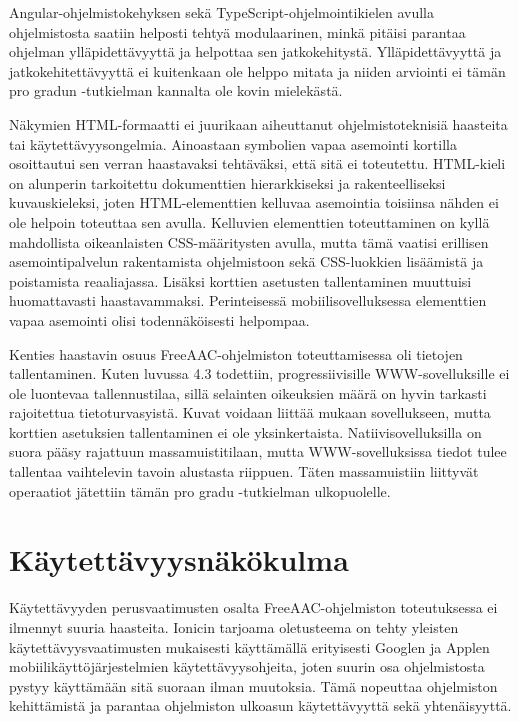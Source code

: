\documentclass[utf8]{gradu3}
\begin{document}
Angular-ohjelmistokehyksen sekä TypeScript-ohjelmointikielen avulla ohjelmistosta saatiin helposti tehtyä modulaarinen, minkä pitäisi parantaa ohjelman ylläpidettävyyttä ja helpottaa sen jatkokehitystä. Ylläpidettävyyttä ja jatkokehitettävyyttä ei kuitenkaan ole helppo mitata ja niiden arviointi ei tämän pro gradun -tutkielman kannalta ole kovin mielekästä.

Näkymien HTML-formaatti ei juurikaan aiheuttanut ohjelmistoteknisiä haasteita tai käytettävyysongelmia. Ainoastaan symbolien vapaa asemointi kortilla osoittautui sen verran haastavaksi tehtäväksi, että sitä ei toteutettu. HTML-kieli on alunperin tarkoitettu dokumenttien hierarkkiseksi ja rakenteelliseksi kuvauskieleksi, joten HTML-elementtien kelluvaa asemointia toisiinsa nähden ei ole helpoin toteuttaa sen avulla. Kelluvien elementtien toteuttaminen on kyllä mahdollista oikeanlaisten CSS-määritysten avulla, mutta tämä vaatisi erillisen asemointipalvelun rakentamista ohjelmistoon sekä CSS-luokkien lisäämistä ja poistamista reaaliajassa. Lisäksi korttien asetusten tallentaminen muuttuisi huomattavasti haastavammaksi. Perinteisessä mobiilisovelluksessa elementtien vapaa asemointi olisi todennäköisesti helpompaa.

Kenties haastavin osuus FreeAAC-ohjelmiston toteuttamisessa oli tietojen tallentaminen. Kuten luvussa 4.3 todettiin, progressiivisille WWW-sovelluksille ei ole luontevaa tallennustilaa, sillä selainten oikeuksien määrä on hyvin tarkasti rajoitettua tietoturvasyistä. Kuvat voidaan liittää mukaan sovellukseen, mutta korttien asetuksien tallentaminen ei ole yksinkertaista. Natiivisovelluksilla on suora pääsy rajattuun massamuistitilaan, mutta WWW-sovelluksissa tiedot tulee tallentaa vaihtelevin tavoin alustasta riippuen. Täten massamuistiin liittyvät operaatiot jätettiin tämän pro gradu -tutkielman ulkopuolelle.

\section{Käytettävyysnäkökulma}

Käytettävyyden perusvaatimusten osalta FreeAAC-ohjelmiston toteutuksessa ei ilmennyt suuria haasteita. Ionicin tarjoama oletusteema on tehty yleisten käytettävyysvaatimusten mukaisesti käyttämällä erityisesti Googlen ja Applen mobiilikäyttöjärjestelmien käytettävyysohjeita, joten suurin osa ohjelmistosta pystyy käyttämään sitä suoraan ilman muutoksia. Tämä nopeuttaa ohjelmiston kehittämistä ja parantaa ohjelmiston ulkoasun käytettävyyttä sekä yhtenäisyyttä.
\end{document}
